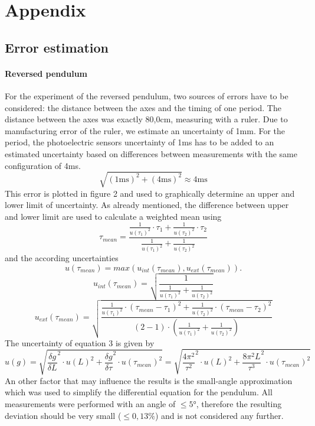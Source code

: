 \documentclass{article}
\begin{document}
\section{Appendix}
\subsection{Error estimation}
\paragraph{Reversed pendulum}
For the experiment of the reversed pendulum, two sources of errors have to be considered: the distance between the axes and the timing of one period.
The distance between the axes was exactly 80,0cm, measuring with a ruler. Due to manufacturing error of the ruler, we estimate an uncertainty of 1mm.
For the period, the photoelectric sensors uncertainty of 1ms has to be added to an estimated uncertainty based on differences between measurements with the same configuration of 4ms.
\begin{equation}
\sqrt{(1\textrm{ms})^2+(4\textrm{ms})^2} \approx 4 \textrm{ms}
\end{equation}
This error is plotted in figure 2 and used to graphically determine an upper and lower limit of uncertainty.
As already mentioned, the difference between upper and lower limit are used to calculate a weighted mean using
\begin{equation}
\tau_{mean} = \frac{\frac{1}{u(\tau_1)^2} \cdot \tau_{1} + \frac{1}{u(\tau_2)^2} \cdot \tau_2}{\frac{1}{u(\tau_1)^2} + \frac{1}{u(\tau_2)^2}}
\end{equation}
and the according uncertainties
\begin{equation}
u(\tau_{mean}) = max(u_{int}(\tau_{mean}), u_{ext}(\tau_{mean})).
\end{equation}
\begin{equation}
u_{int}(\tau_{mean}) = \sqrt{\frac{1}{\frac{1}{u(\tau_1)^2}+\frac{1}{u(\tau_2)^2}}}
\end{equation}
\begin{equation}
u_{ext}(\tau_{mean}) = \sqrt{\frac{\frac{1}{u(\tau_1)^2} \cdot (\tau_{mean} - \tau_1)^2+ \frac{1}{u(\tau_2)^2} \cdot (\tau_{mean} - \tau_2)^2}{(2-1)\cdot (\frac{1}{u(\tau_1)^2}+\frac{1}{u(\tau_2)^2})}}
\end{equation}
The uncertainty of equation 3 is given by
\begin{equation}
u(g) = \sqrt{\frac{\delta g}{\delta L}^2 \cdot u(L)^2 + \frac{\delta g}{\delta\tau}^2 \cdot u(\tau_{mean})^2} = \sqrt{\frac{4\pi^2}{\tau^2}^2 \cdot u(L)^2 + \frac{8\pi^2L}{\tau^3}^2 \cdot u(\tau_{mean})^2}
\end{equation}
An other factor that may influence the results is the small-angle approximation which was used to simplify the differential equation for the pendulum.
All measurements were performed with an angle of $\leq 5°$, therefore the resulting deviation should be very small ($\leq 0,13\% $) and is not considered any further. 
\end{document}

